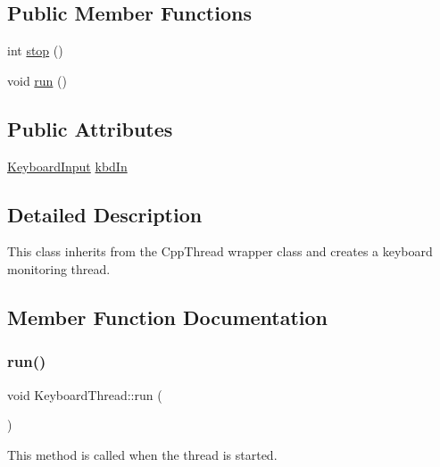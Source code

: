 \subsection*{Public Member Functions}
\begin{DoxyCompactItemize}
\item 
int \hyperlink{classdrumpi_1_1KeyboardThread_a2e106118779a9a70aabf9c291c2f9a36}{stop} ()
\item 
void \hyperlink{classdrumpi_1_1KeyboardThread_a406ee901b3d40676ba070548b3ac7d12}{run} ()
\end{DoxyCompactItemize}
\subsection*{Public Attributes}
\begin{DoxyCompactItemize}
\item 
\hyperlink{classdrumpi_1_1KeyboardInput}{Keyboard\+Input} \hyperlink{classdrumpi_1_1KeyboardThread_a2f248c78ba5f7bcd0f4db0fc3050ef4d}{kbd\+In}
\end{DoxyCompactItemize}


\subsection{Detailed Description}
This class inherits from the Cpp\+Thread wrapper class and creates a keyboard monitoring thread. 

\subsection{Member Function Documentation}
\mbox{\label{classdrumpi_1_1KeyboardThread_a406ee901b3d40676ba070548b3ac7d12}} 
\subsubsection{\texorpdfstring{run()}{run()}}
{\footnotesize\ttfamily void Keyboard\+Thread\+::run (\begin{DoxyParamCaption}{ }\end{DoxyParamCaption})}

This method is called when the thread is started. \mbox{\label{classdrumpi_1_1KeyboardThread_a2e106118779a9a70aabf9c291c2f9a36}} 
